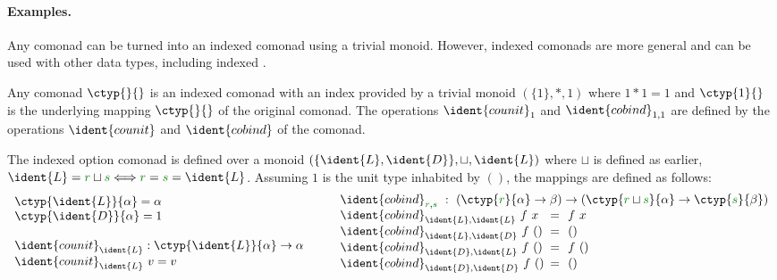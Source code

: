 \paragraph{Examples.}

Any comonad can be turned into an indexed comonad using a trivial monoid. However, indexed comonads
are more general and can be used with other data types, including indexed . 

\begin{example}[Comonads]
Any comonad $\ctyp{}{}$ is an indexed comonad with an index provided by a trivial monoid $(\{1\},\ast,1)$
where $1\ast 1 = 1$ and $\ctyp{1}{}$ is the underlying mapping $\ctyp{}{}$ of the original comonad. The
operations $\ident{counit}_1$ and $\ident{cobind}_{1,1}$ are defined by the operations $\ident{counit}$
and $\ident{cobind}$ of the comonad.
\end{example}

\begin{example}
The indexed option comonad is defined over a monoid $(\{ \ident{L},\ident{D} \}, \sqcup,\ident{L})$ 
where $\sqcup$ is defined as earlier, \ie~$\ident{L} = \cclrd{r} \sqcup \cclrd{s} \Longleftrightarrow \cclrd{r}=\cclrd{s}=\ident{L}$.
Assuming $1$ is the unit type inhabited by $()$, the mappings are defined as follows:
%
\begin{equation*}
\begin{array}{l}
\ctyp{\ident{L}}{\alpha} = \alpha\\
\ctyp{\ident{D}}{\alpha} = 1\\
\\
\ident{counit}_{\ident{L}} : \ctyp{\ident{L}}{\alpha} \rightarrow \alpha \\
\ident{counit}_{\ident{L}}~v = v\\
\end{array}
\qquad
\begin{array}{lcl}
\multicolumn{3}{l}{
  \ident{cobind}_{\cclrd{r},\cclrd{s}} ~:~ (\ctyp{\cclrd{r}}{\alpha} \rightarrow \beta) 
    \rightarrow (\ctyp{\cclrd{r}\sqcup\cclrd{s}}{\alpha} \rightarrow \ctyp{\cclrd{s}}{\beta}) }\\
\ident{cobind}_{\ident{L},\ident{L}}~f~x &\narrow{=}& f~x\\
\ident{cobind}_{\ident{L},\ident{D}}~f~() &\narrow{=}& ()\\
\ident{cobind}_{\ident{D},\ident{L}}~f~() &\narrow{=}& f~()\\
\ident{cobind}_{\ident{D},\ident{D}}~f~() &\narrow{=}& ()\\
\end{array}
\end{equation*}
\end{example}

